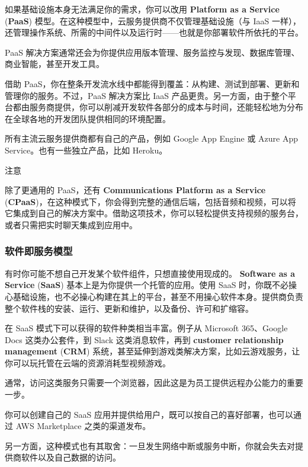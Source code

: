 \label{idx:272}
\label{idx:273}
如果基础设施本身无法满足你的需求，你可以改用 \textbf{Platform as a Service }(\textbf{PaaS}) 模型。在这种模型中，云服务提供商不仅管理基础设施（与 IaaS 一样），还管理操作系统、所需的中间件以及运行时——也就是你部署软件所依托的平台。

PaaS 解决方案通常还会为你提供应用版本管理、服务监控与发现、数据库管理、商业智能，甚至开发工具。

借助 PaaS，你在整条开发流水线中都能得到覆盖：从构建、测试到部署、更新和管理你的服务。不过，PaaS 解决方案比 IaaS 产品更贵。另一方面，由于整个平台都由服务商提供，你可以削减开发软件各部分的成本与时间，还能轻松地为分布在全球各地的开发团队提供相同的环境配置。

所有主流云服务提供商都有自己的产品，例如 Google App Engine 或 Azure App Service。也有一些独立产品，比如 Heroku。

\begin{myNotic}{注意}

\label{idx:274}
\label{idx:275}
除了更通用的 PaaS，还有 \textbf{Communications Platform as a Service }(\textbf{CPaaS})，在这种模式下，你会得到完整的通信后端，包括音频和视频，可以将它集成到自己的解决方案中。借助这项技术，你可以轻松提供支持视频的服务台，或者只需把实时聊天集成到应用中。
\end{myNotic}

\subsubsection{软件即服务模型}

\label{idx:276}
\label{idx:277}
有时你可能不想自己开发某个软件组件，只想直接使用现成的。 \textbf{Software as a Service }(\textbf{SaaS}) 基本上是为你提供一个托管的应用。使用 SaaS 时，你既不必操心基础设施，也不必操心构建在其上的平台，甚至不用操心软件本身。提供商负责整个软件栈的安装、运行、更新和维护，以及备份、许可和扩缩容。

\label{idx:278}
在 SaaS 模式下可以获得的软件种类相当丰富。例子从 Microsoft 365、Google Docs 这类办公套件，到 Slack 这类消息软件，再到 \textbf{customer relationship management }(\textbf{CRM}) 系统，甚至延伸到游戏类解决方案，比如云游戏服务，让你可以玩托管在云端的资源消耗型视频游戏。

通常，访问这类服务只需要一个浏览器，因此这是为员工提供远程办公能力的重要一步。

你可以创建自己的 SaaS 应用并提供给用户，既可以按自己的喜好部署，也可以通过 AWS Marketplace 之类的渠道发布。

另一方面，这种模式也有其取舍：一旦发生网络中断或服务中断，你就会失去对提供商软件以及自己数据的访问。


